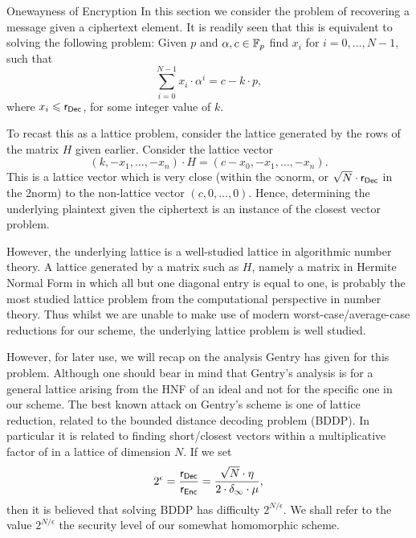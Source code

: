 \begin{bparagraph}{Onewayness of Encryption}
	In this section we consider the problem of recovering a message given a ciphertext element.
	It is readily seen that this is	equivalent to solving the following problem: Given $p$ and $\alpha, c \in \mathbb{F}_p $ find $x_i$ for $i=0, \dots, N-1$, such that
	\[
	\sum_{i=0}^{N-1}{x_i \cdot \alpha^i} = c-k \cdot p,
	\]
	where $x_i \leqslant \textsf{r}_{\textsf{Dec}}$, for some integer value of $k$.
	
	To recast this as a lattice problem, consider the lattice generated by the rows of the matrix $H$ given earlier.
	Consider the lattice vector
	\[
	(k, -x_1, \dots, -x_n) \cdot H = (c-x_0, -x_1, \dots, -x_n).
	\]
	This is a lattice vector which is very close (within  the $\infty$\ndash norm, or $\sqrt{N} \cdot \textsf{r}_{\textsf{Dec}}$ in the 2\ndash norm) to the non-lattice vector $(c, 0, \dots, 0)$. Hence, determining the underlying plaintext given the ciphertext is an instance of the closest vector problem.
	
	However, the underlying lattice is a well-studied lattice in algorithmic number theory.
	A lattice generated by a matrix such as $H$, namely a matrix in Hermite Normal Form in which all but one diagonal entry is equal to one, is probably the most studied	lattice problem from the computational perspective in number theory.
	Thus whilst we are unable to make use of modern worst-case/average-case reductions for our scheme, the underlying lattice problem is well studied.
	
	However, for later use, we will recap on the analysis Gentry has given for this problem. 
	Although one should bear in mind that Gentry's analysis is for a general lattice arising from the HNF of an ideal and not for the specific one in our scheme.
	The best known attack on Gentry's scheme is one of lattice reduction, related to the bounded distance decoding problem (BDDP). 
	In particular it is	related to finding short/closest vectors within a multiplicative factor of  in a lattice of dimension $N$.
	If we set
	\[
	2^\epsilon = \frac{\textsf{r}_{\textsf{Dec}}}{\textsf{r}_{\textsf{Enc}}} = \frac{\sqrt{N} \cdot \eta}{2 \cdot \delta_\infty \cdot \mu},
	\]
	then it is believed that solving BDDP has difficulty $2^{N/\epsilon}$.
	We shall refer to the value $2^{N/\epsilon}$ the security level of our somewhat homomorphic scheme.
\end{bparagraph}

